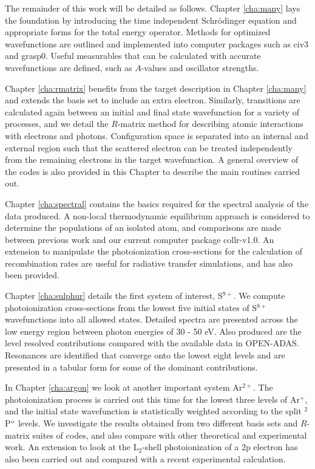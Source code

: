 The remainder of this work will be detailed as follows. Chapter \ref{cha:many} lays the foundation by introducing the time independent Schr\"odinger equation and appropriate forms for the total energy operator. Methods for optimized wavefunctions are outlined and implemented into computer packages such as {\sc civ3} and {\sc grasp0}. Useful measurables that can be calculated with accurate wavefunctions are defined, such as $A$-values and oscillator strengths.

Chapter \ref{cha:rmatrix} benefits from the target description in Chapter \ref{cha:many} and extends the basis set to include an extra electron. Similarly, transitions are calculated again between an initial and final state wavefunction for a variety of processes, and we detail the $R$-matrix method for describing atomic interactions with electrons and photons. Configuration space is separated into an internal and external region such that the scattered electron can be treated independently from the remaining electrons in the target wavefunction. A general overview of the codes is also provided in this Chapter to describe the main routines carried out.

Chapter \ref{cha:spectral} contains the basics required for the spectral analysis of the data produced. A non-local thermodynamic equilibrium approach is considered to determine the populations of an isolated atom, and comparisons are made between previous work and our current computer package {\sc collr-v1.0}. An extension to manipulate the photoionization cross-sections for the calculation of recombination rates are useful for radiative transfer simulations, and has also been provided.

Chapter \ref{cha:sulphur} details the first system of interest, S$^{9+}$. We compute photoionization cross-sections from the lowest five initial states of S$^{8+}$ wavefunctions into all allowed states. Detailed spectra are presented across the low energy region between photon energies of 30 - 50 eV. Also produced are the level resolved contributions compared with the available data in OPEN-ADAS. Resonances are identified that converge onto the lowest eight levels and are presented in a tabular form for some of the dominant contributions.

In Chapter \ref{cha:argon} we look at another important system Ar$^{2+}$. The photoionization process is carried out this time for the lowest three levels of Ar$^{+}$, and the initial state wavefunction is statistically weighted according to the split $^2$P$^{\rm o}$ levels. We investigate the results obtained from two different basis sets and $R$-matrix suites of codes, and also compare with other theoretical and experimental work. An extension to look at the L$_2$-shell photoionization of a 2p electron has also been carried out and compared with a recent experimental calculation.

